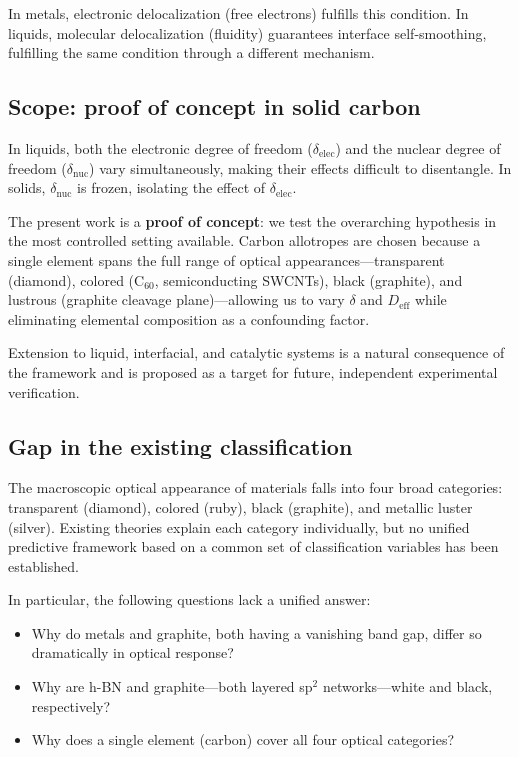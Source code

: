 \documentclass[twocolumn,showpacs,preprintnumbers,amsmath,amssymb,prb]{revtex4-2}
\begin{document}
In metals, electronic delocalization (free electrons) fulfills this
condition. In liquids, molecular delocalization (fluidity) guarantees
interface self-smoothing, fulfilling the same condition through a
different mechanism.

\subsection{Scope: proof of concept in solid carbon}

In liquids, both the electronic degree of freedom ($\delta_\mathrm{elec}$)
and the nuclear degree of freedom ($\delta_\mathrm{nuc}$) vary
simultaneously, making their effects difficult to disentangle. In solids,
$\delta_\mathrm{nuc}$ is frozen, isolating the effect of
$\delta_\mathrm{elec}$.

The present work is a \textbf{proof of concept}: we test the overarching
hypothesis in the most controlled setting available. Carbon allotropes are
chosen because a single element spans the full range of optical
appearances---transparent (diamond), colored (C$_{60}$, semiconducting
SWCNTs), black (graphite), and lustrous (graphite cleavage
plane)---allowing us to vary $\delta$ and $D_\mathrm{eff}$ while
eliminating elemental composition as a confounding factor.

Extension to liquid, interfacial, and catalytic systems is a natural
consequence of the framework and is proposed as a target for future,
independent experimental verification.

\subsection{Gap in the existing classification}

The macroscopic optical appearance of materials falls into four broad
categories: transparent (diamond), colored (ruby), black (graphite),
and metallic luster (silver). Existing theories explain each category
individually, but no unified predictive framework based on a common set
of classification variables has been established.

In particular, the following questions lack a unified answer:
\begin{itemize}
  \item Why do metals and graphite, both having a vanishing band gap,
    differ so dramatically in optical response?
  \item Why are h-BN and graphite---both layered sp$^2$
    networks---white and black, respectively?
  \item Why does a single element (carbon) cover all four optical
    categories?
\end{itemize}
\end{document}
